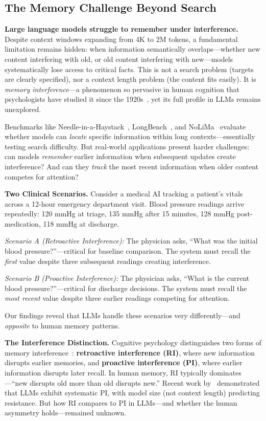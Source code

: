 \documentclass{article}
\begin{document}
\subsection{The Memory Challenge Beyond Search}

\textbf{Large language models struggle to remember under interference.} Despite context windows expanding from 4K to 2M tokens, a fundamental limitation remains hidden: when information semantically overlaps---whether new content interfering with old, or old content interfering with new---models systematically lose access to critical facts. This is not a search problem (targets are clearly specified), nor a context length problem (the content fits easily). It is \textit{memory interference}---a phenomenon so pervasive in human cognition that psychologists have studied it since the 1920s~\citep{jenkins1924obliviscence}, yet its full profile in LLMs remains unexplored.

Benchmarks like Needle-in-a-Haystack~\citep{kamradt2023niah}, LongBench~\citep{bai2024longbench}, and NoLiMa~\citep{modarressi2025nolima} evaluate whether models can \textit{locate} specific information within long contexts---essentially testing search difficulty. But real-world applications present harder challenges: can models \textit{remember} earlier information when subsequent updates create interference? And can they \textit{track} the most recent information when older content competes for attention?

\textbf{Two Clinical Scenarios.} Consider a medical AI tracking a patient's vitals across a 12-hour emergency department visit. Blood pressure readings arrive repeatedly: 120 mmHg at triage, 135 mmHg after 15 minutes, 128 mmHg post-medication, 118 mmHg at discharge.

\textit{Scenario A (Retroactive Interference):} The physician asks, ``What was the initial blood pressure?''---critical for baseline comparison. The system must recall the \textit{first} value despite three subsequent readings creating interference.

\textit{Scenario B (Proactive Interference):} The physician asks, ``What is the current blood pressure?''---critical for discharge decisions. The system must recall the \textit{most recent} value despite three earlier readings competing for attention.

Our findings reveal that LLMs handle these scenarios very differently---and \textit{opposite} to human memory patterns.

\textbf{The Interference Distinction.} Cognitive psychology distinguishes two forms of memory interference~\citep{jenkins1924obliviscence, underwood1957interference}: \textbf{retroactive interference (RI)}, where new information disrupts earlier memories, and \textbf{proactive interference (PI)}, where earlier information disrupts later recall. In human memory, RI typically dominates---``new disrupts old more than old disrupts new.'' Recent work by~\citet{liu2024unable} demonstrated that LLMs exhibit systematic PI, with model size (not context length) predicting resistance. But how RI compares to PI in LLMs---and whether the human asymmetry holds---remained unknown.
\end{document}
